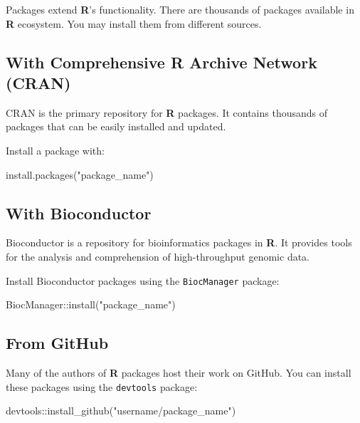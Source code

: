 \documentclass[
  letterpaper,
  DIV=11,
  numbers=noendperiod]{scrreprt}
\newenvironment{Shaded}{\begin{snugshade}}{\end{snugshade}}
\newcommand{\FunctionTok}[1]{\textcolor[rgb]{0.28,0.35,0.67}{#1}}
\newcommand{\NormalTok}[1]{\textcolor[rgb]{0.00,0.23,0.31}{#1}}
\newcommand{\SpecialCharTok}[1]{\textcolor[rgb]{0.37,0.37,0.37}{#1}}
\newcommand{\StringTok}[1]{\textcolor[rgb]{0.13,0.47,0.30}{#1}}
\begin{document}
Packages extend \textbf{R}'s functionality. There are thousands of
packages available in \textbf{R} ecosystem. You may install them from
different sources.

\subsection{With Comprehensive R Archive Network
(CRAN)}\label{with-comprehensive-r-archive-network-cran}

CRAN is the primary repository for \textbf{R} packages. It contains
thousands of packages that can be easily installed and updated.

Install a package with:

\begin{Shaded}
\begin{Highlighting}[]
\FunctionTok{install.packages}\NormalTok{(}\StringTok{"package\_name"}\NormalTok{)}
\end{Highlighting}
\end{Shaded}

\subsection{With Bioconductor}\label{with-bioconductor}

Bioconductor is a repository for bioinformatics packages in \textbf{R}.
It provides tools for the analysis and comprehension of high-throughput
genomic data.

Install Bioconductor packages using the \texttt{BiocManager} package:

\begin{Shaded}
\begin{Highlighting}[]
\NormalTok{BiocManager}\SpecialCharTok{::}\FunctionTok{install}\NormalTok{(}\StringTok{"package\_name"}\NormalTok{)}
\end{Highlighting}
\end{Shaded}

\subsection{From GitHub}\label{from-github}

Many of the authors of \textbf{R} packages host their work on GitHub.
You can install these packages using the \texttt{devtools} package:

\begin{Shaded}
\begin{Highlighting}[]
\NormalTok{devtools}\SpecialCharTok{::}\FunctionTok{install\_github}\NormalTok{(}\StringTok{"username/package\_name"}\NormalTok{)}
\end{Highlighting}
\end{Shaded}
\end{document}
